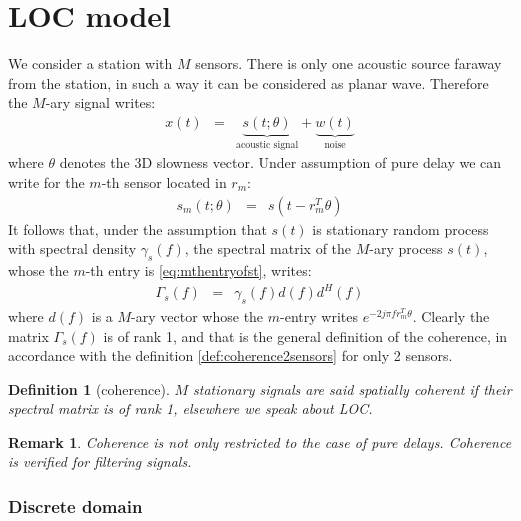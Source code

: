 \documentclass[a4paper, 12pt]{report}
\newtheorem{remark}{Remark}
\newtheorem{definition}{Definition}
\begin{document}
\newpage\clearpage
 \section{LOC model}


We consider a station with $M$ sensors. There is only one acoustic source faraway from the station, in such a way it can be considered as planar wave. Therefore the $M$-ary signal  writes: 
\begin{eqnarray*}
x(t) & = & \underbrace{s(t;\theta)}_{\text{acoustic signal}}+ \underbrace{w(t)}_{\text{noise}}
\end{eqnarray*}
where $\theta$ denotes the 3D slowness vector. Under assumption of pure delay we can write for the $m$-th sensor located in $r_{m}$:
\begin{eqnarray}
\label{eq:mthentryofst}
s_{m}(t;\theta)&=&s(t-r_{m}^{T}\theta)
\end{eqnarray}
It follows  that, under the assumption  that $s(t)$ is stationary random process with spectral density $\gamma_{s}(f)$, the spectral matrix of the $M$-ary process $s(t)$, whose the $m$-th entry is \eqref{eq:mthentryofst}, writes:
\begin{eqnarray*}
\Gamma_{s}(f)&=&\gamma_{s}(f)d(f)d^{H}(f)
\end{eqnarray*}
where $d(f)$ is a $M$-ary vector whose the $m$-entry writes $e^{-2j\pi fr_{m}^{T}\theta}$. Clearly the matrix $\Gamma_{s}(f)$ is of rank 1, and that is the general definition of the coherence, in accordance with the definition \ref{def:coherence2sensors} for only 2 sensors. 
\begin{definition}[coherence]
\label{def:coherenceMsensors}
$M$ stationary signals are said spatially coherent if their spectral matrix is of rank 1, elsewhere we speak about LOC. 
\end{definition}

\begin{remark}
Coherence is not only restricted to the case of pure delays. Coherence is verified for filtering signals.
\end{remark}


\subsubsection{Discrete domain}
\end{document}
